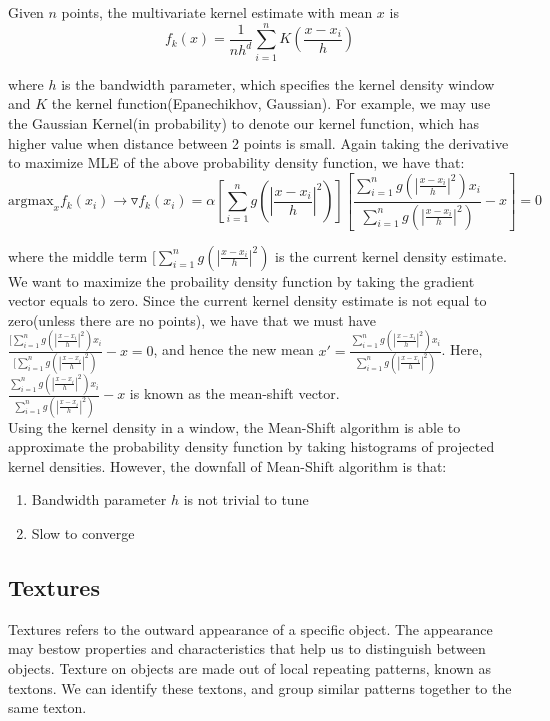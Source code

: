 \documentclass[12pt]{article}
\begin{document}
Given $n$ points, the multivariate kernel estimate with mean $x$ is
\begin{equation}
f_k(x) = \frac{1}{nh^d} \sum^n_{i=1} K(\frac{x - x_i}{h})
\end{equation}

where $h$ is the bandwidth parameter, which specifies the kernel density window and $K$ the kernel function(Epanechikhov, Gaussian). For example, we may use the Gaussian Kernel(in probability) to denote our kernel function, which has higher value when distance between 2 points is small. Again taking the derivative to maximize MLE of the above probability density function, we have that:
\begin{equation}
\text{argmax}_x f_k(x_i) \rightarrow \triangledown f_k(x_i) = \alpha [\sum_{i=1}^n g(|\frac{x-x_i}{h}|^2)] [\frac{\sum_{i=1}^n g(|\frac{x-x_i}{h}|^2) x_i}{\sum_{i=1}^n g(|\frac{x-x_i}{h}|^2)} - x] = 0
\end{equation}

where the middle term $[\sum_{i=1}^n g(|\frac{x-x_i}{h}|^2)$ is the current kernel density estimate. We want to maximize the probaility density function by taking the gradient vector equals to zero. Since the current kernel density estimate is not equal to zero(unless there are no points), we have that we must have $\frac{[\sum_{i=1}^n g(|\frac{x-x_i}{h}|^2) x_i}{[\sum_{i=1}^n g(|\frac{x-x_i}{h}|^2)} - x = 0$, and hence the new mean $x' = \frac{\sum_{i=1}^n g(|\frac{x-x_i}{h}|^2) x_i}{\sum_{i=1}^n g(|\frac{x-x_i}{h}|^2)}$. Here, $\frac{\sum_{i=1}^n g(|\frac{x-x_i}{h}|^2) x_i}{\sum_{i=1}^n g(|\frac{x-x_i}{h}|^2)} - x$ is known as the mean-shift vector.\\

Using the kernel density in a window, the Mean-Shift algorithm is able to approximate the probability density function by taking histograms of projected kernel densities. However, the downfall of Mean-Shift algorithm is that:
\begin{enumerate}
\item Bandwidth parameter $h$ is not trivial to tune
\item Slow to converge
\end{enumerate}

\subsection{Textures}

Textures refers to the outward appearance of a specific object. The appearance may bestow properties and characteristics that help us to distinguish between objects. Texture on objects are made out of local repeating patterns, known as textons. We can identify these textons, and group similar patterns together to the same texton.
\end{document}
